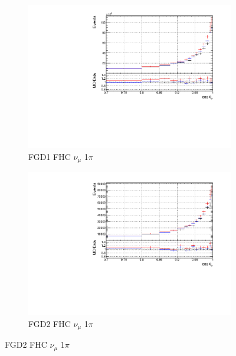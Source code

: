 \begin{figure}[!htbp]
\begin{subfigure}{0.49\textwidth}
  \centering
  \includegraphics[width=\textwidth]{figs/priorpred1D_t_FGD1_numuCC_1pi}
  \caption{FGD1 FHC $\nu_{\mu}$ 1$\pi$}
\end{subfigure}
\begin{subfigure}{0.49\textwidth}
  \centering
  \includegraphics[width=\textwidth]{figs/priorpred1D_t_FGD2_numuCC_1pi}
  \caption{FGD2 FHC $\nu_{\mu}$ 1$\pi$}
\end{subfigure}


\end{figure}

